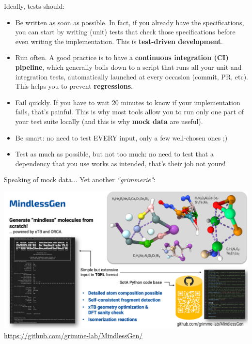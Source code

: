 \documentclass[10pt,
aspectratio=169
]{beamer}
\begin{document}
\begin{frame}
	Ideally, tests should: \begin{itemize}
		\item Be written as soon as possible. In fact, if you already have the specifications, you can start by writing (unit) tests that check those specifications before even writing the implementation. This is \textbf{test-driven development}. 
		\item Run often. A good practice is to have a \textbf{continuous integration (CI) pipeline}, which generally boils down to a script that runs all your unit and integration tests, automatically launched at every occasion (commit, PR, etc). This helps you to prevent \textbf{regressions}.
		\item Fail quickly. If you have to wait 20 minutes to know if your implementation fails, that's painful. This is why most tools allow you to run only one part of your test suite locally (and this is why \textbf{mock data} are useful).
		\item Be smart: no need to test EVERY input, only a few well-chosen ones ;)
		\item Test as much as possible, but not too much: no need to test that a dependency that you use works as intended, that's their job not yours!
	\end{itemize}
\end{frame}

\begin{frame}
	Speaking of mock data... Yet another \textit{``grimmerie"}:
	\begin{center}
	\includegraphics[width=.7\linewidth]{im/MindlessGen}
	\url{https://github.com/grimme-lab/MindlessGen/}
	\end{center}
\end{frame}
\end{document}
